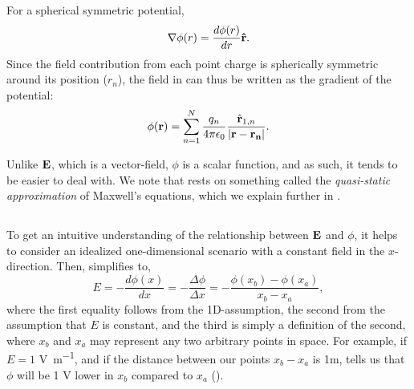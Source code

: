 For a spherical symmetric potential, 
\begin{equation}
{\bf \nabla} \phi(r) = \frac{d\phi(r)}{dr} {\bf \hat{r}}.
\label{eq:Basics:SphericalNablaPhi}
\end{equation}
Since the field contribution from each point charge is spherically symmetric around its position ($r_n$), the field in  can thus be written as the gradient of the potential: 
\begin{equation}
{\phi}({\bf r}) = \sum_{n=1}^{N}  \frac{q_n}{4\pi \epsilon_0} \frac{\hat{{\bf r}}_{1,n}}{|{\bf r}-{\bf r_n}|}.
\label{eq:Basics:CoulombPhiN}
\end{equation}

Unlike ${\bf E}$, which is a vector-field, $\phi$ is a scalar function, and as such, it tends to be easier to deal with. We note that  rests on something called the \textit{quasi-static approximation} of Maxwell's equations, which we explain further in . 


\subsection{}
\label{sec:Basics:Ground} 
To get an intuitive understanding of the relationship between ${\bf E}$ and $\phi$, it helps to consider an idealized one-dimensional scenario with a constant field in the $x$-direction. Then,  simplifies to,
\begin{equation}
E = -\frac{d\phi(x)}{dx} = -\frac{\Delta \phi}{\Delta x} = -\frac{\phi(x_b)-\phi(x_a)}{x_b-x_a},
\label{eq:Basics:EV1D}
\end{equation}
where the first equality follows from the 1D-assumption, the second from the assumption that $E$ is constant, and the third is simply a definition of the second, where $x_b$ and $x_a$ may represent any two arbitrary points in space. For example, if $E = 1$ \si{\volt\per\metre}, and if the distance between our points $x_b-x_a$ is 1m,  tells us that $\phi$ will be 1 \si{\volt} lower in $x_b$ compared to $x_a$ ().

